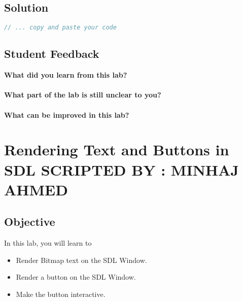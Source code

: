 \documentclass[11pt,fleqn]{book} %
\begin{document}
\newpage
\section{Solution}
\begin{lstlisting}[language=C++]
  // ... copy and paste your code
\end{lstlisting}

\newpage
\section{Student Feedback}
\textbf{What did you learn from this lab?}\\
\noindent\fbox{\parbox{\textwidth}{
  }
}\\
\textbf{What part of the lab is still unclear to you?}\\
\noindent\fbox{\parbox{\textwidth}{
  }
}\\
\textbf{What can be improved in this lab?}\\ 
\noindent\fbox{\parbox{\textwidth}{
  }
}

\newpage
\pagestyle{empty} %

\cleardoublepage %

\pagestyle{fancy} %


\chapter{Rendering Text and Buttons in SDL \hspace{1mm} {\textsc{\small SCRIPTED BY : MINHAJ AHMED}}}

\section{Objective}

In this lab, you will learn to

\begin{itemize}
\item Render Bitmap text on the SDL Window.
\item Render a button on the SDL Window.
\item Make the button interactive.
\end{itemize}
\end{document}
